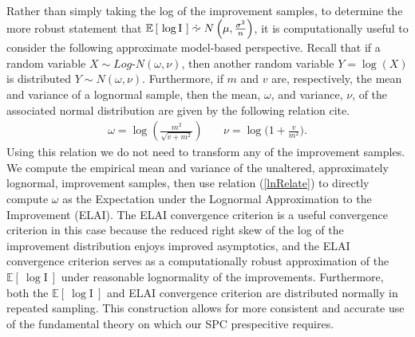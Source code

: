 \documentclass[12pt]{article}
\newcommand{\E}[1]{
        \mathbb{E}\left[~#1~\right]
}
\newcommand*{\approxdist}{\mathrel{\vcenter{\offinterlineskip
\vskip-.25ex\hbox{\hskip.55ex$\cdot$}\vskip-.25ex\hbox{$\sim$}
\vskip-.5ex\hbox{\hskip.55ex$\cdot$}}}}
\begin{document}
%
%

%
Rather than simply taking the log of the improvement samples, to determine the more robust statement that $\mathbb{E}\left[~\log\text{I}~\right] \approxdist N\left(\mu, \frac{\sigma^2}{n}\right)$, it is computationally useful to consider the following approximate model-based perspective.   
%
Recall that if a random variable \mbox{$X\sim Log$-$N(\omega, \nu)$,} then another random variable $Y=\log(X)$ is distributed $Y\sim N(\omega, \nu)$.
%
Furthermore, if $m$ and $v$ are, respectively, the mean and variance of a lognormal sample, then the mean, $\omega$, and variance, $\nu$, of the associated normal distribution are given by the following relation {\color{red}cite}.
%
\begin{eqnarray}
\omega = \log\left( \frac{m^2}{\sqrt{v+m^2}} \right) &~&  \nu = \log\bigg( 1+ \frac{v}{m^2} \bigg).
\label{lnRelate}
\end{eqnarray}
%
Using this relation we do not need to transform any of the improvement samples.
%
We compute the empirical mean and variance of the unaltered, approximately lognormal, improvement samples, then use relation (\ref{lnRelate}) to directly compute $\omega$ as the Expectation under the Lognormal Approximation to the Improvement (ELAI).
%
The ELAI convergence criterion is a useful convergence criterion in this case because the reduced right skew of the log of the improvement distribution enjoys improved asymptotics, and the ELAI convergence criterion serves as a computationally robust approximation of the $\E{\log\text{I}}$ under reasonable lognormality of the improvements.
Furthermore, both the $\E{\log\text{I}}$ and ELAI convergence criterion are distributed normally in repeated sampling.
%
This construction allows for more consistent and accurate use of the fundamental theory on which our SPC prespecitive requires.

\end{document}
